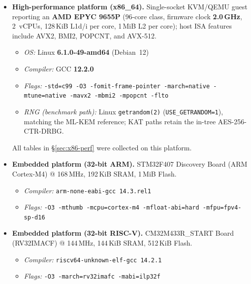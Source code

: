 \begin{itemize}
  \item \textbf{High-performance platform (x86\_64).}
        Single-socket KVM/QEMU guest reporting an \textbf{AMD EPYC 9655P}
        (96-core class, firmware clock \textbf{2.0\,GHz}, 2~vCPUs, 128\,KiB
        L1d/i per core, 1\,MiB L2 per core); host ISA features include AVX2,
        BMI2, POPCNT, and AVX-512.
        \begin{itemize}
          \item \textit{OS:} Linux \textbf{6.1.0-49-amd64} (Debian~12)
          \item \textit{Compiler:} GCC \textbf{12.2.0}
          \item \textit{Flags:} \texttt{-std=c99 -O3 -fomit-frame-pointer
                -march=native -mtune=native -mavx2 -mbmi2 -mpopcnt -flto}
          \item \textit{RNG (benchmark path):} Linux \texttt{getrandom(2)}
                (\texttt{USE\_GETRANDOM=1}), matching the ML-KEM reference;
                KAT paths retain the in-tree AES-256-CTR-DRBG.
        \end{itemize}
        All tables in \S\ref{sec:x86-perf} were collected on this platform.

  \item \textbf{Embedded platform (32-bit ARM).}
        STM32F407 Discovery Board (ARM Cortex-M4) @ 168\,MHz, 192\,KiB SRAM,
        1\,MiB Flash.
        \begin{itemize}
          \item \textit{Compiler:} \texttt{arm-none-eabi-gcc 14.3.rel1}
          \item \textit{Flags:} \texttt{-O3 -mthumb -mcpu=cortex-m4
                -mfloat-abi=hard -mfpu=fpv4-sp-d16}
        \end{itemize}

  \item \textbf{Embedded platform (32-bit RISC-V).}
        CM32M433R\_START Board (RV32IMACF) @ 144\,MHz, 144\,KiB SRAM,
        512\,KiB Flash.
        \begin{itemize}
          \item \textit{Compiler:} \texttt{riscv64-unknown-elf-gcc 14.2.1}
          \item \textit{Flags:} \texttt{-O3 -march=rv32imafc -mabi=ilp32f}
        \end{itemize}
\end{itemize}


